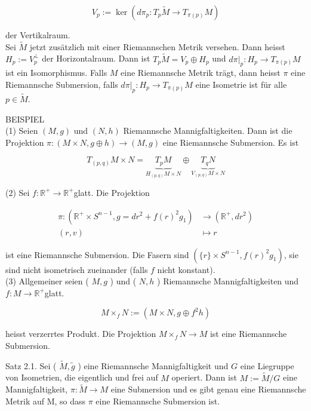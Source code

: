 \documentclass[10pt, letterpaper]{article}
\begin{document}
$$
V_{p}:=\operatorname{ker}\left(d \pi_{p}: T_{p} \tilde{M} \rightarrow T_{\pi(p)} M\right)
$$

der Vertikalraum.\\
Sei $\tilde{M}$ jetzt zusätzlich mit einer Riemannschen Metrik versehen. Dann heisst $H_{p}:=V_{p}^{\perp}$ der Horizontalraum. Dann ist $T_{p} \tilde{M}=V_{p} \oplus H_{p}$ und $\left.d \pi\right|_{p}: H_{p} \rightarrow T_{\pi(p)} M$ ist ein Isomorphismus. Falls $M$ eine Riemannsche Metrik trägt, dann heisst $\pi$ eine Riemannsche Submersion, falls $\left.d \pi\right|_{p}: H_{p} \rightarrow T_{\pi(p)} M$ eine Isometrie ist für alle $p \in \tilde{M}$.

BEISPIEL\\
(1) Seien $(M, g)$ und $(N, h)$ Riemannsche Mannigfaltigkeiten. Dann ist die Projektion $\pi:(M \times N, g \oplus h) \rightarrow(M, g)$ eine Riemannsche Submersion. Es ist

$$
T_{(p, q)} M \times N=\underbrace{T_{p} M}_{H_{(p, q)} M \times N} \oplus \underbrace{T_{q} N}_{V_{(p, q)} M \times N}
$$

(2) Sei $f: \mathbb{R}^{+} \rightarrow \mathbb{R}^{+}$glatt. Die Projektion

$$
\begin{aligned}
\pi:\left(\mathbb{R}^{+} \times S^{n-1}, g=d r^{2}+f(r)^{2} g_{1}\right) & \rightarrow\left(\mathbb{R}^{+}, d r^{2}\right) \\
(r, v) & \mapsto r
\end{aligned}
$$

ist eine Riemannsche Submersion. Die Fasern sind $\left(\{r\} \times S^{n-1}, f(r)^{2} g_{1}\right)$, sie sind nicht isometrisch zueinander (falls $f$ nicht konstant).\\
(3) Allgemeiner seien ( $M, g$ ) und ( $N, h$ ) Riemannsche Mannigfaltigkeiten und $f: M \rightarrow \mathbb{R}^{+}$glatt.

$$
M \times_{f} N:=\left(M \times N, g \oplus f^{2} h\right)
$$

heisst verzerrtes Produkt. Die Projektion $M \times_{f} N \rightarrow M$ ist eine Riemannsche Submersion.

Satz 2.1. Sei ( $\tilde{M}, \tilde{g}$ ) eine Riemannsche Mannigfaltigkeit und $G$ eine Liegruppe von Isometrien, die eigentlich und frei auf $M$ operiert. Dann ist $M:=\tilde{M} / G$ eine Mannigfaltigkeit, $\pi: \tilde{M} \rightarrow M$ eine Submersion und es gibt genau eine Riemannsche Metrik auf M, so dass $\pi$ eine Riemannsche Submersion ist.
\end{document}
